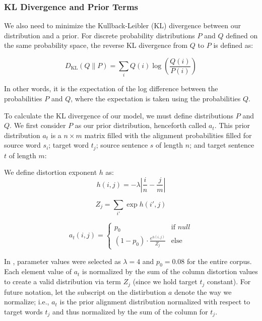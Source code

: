 \documentclass[twoside,twocolumn]{article}
\begin{document}
\subsubsection{KL Divergence and Prior Terms}

We also need to minimize the Kullback-Leibler (KL) divergence between our
distribution and a prior. For discrete probability distributions $P$ and $Q$
defined on the same probability space, the reverse KL divergence from $Q$ to
$P$ is defined as:

\begin{equation}
D_{\mathrm{KL}}(Q \| P) = \sum_{i} Q(i) \log \left( \frac{Q(i)}{P(i)} \right)
\end{equation}

In other words, it is the expectation of the log difference between the
probabilities $P$ and $Q$, where the expectation is taken using the
probabilities $Q$.

To calculate the KL divergence of our model, we must define
distributions $P$ and $Q$. We first consider $P$ as our prior
distribution, henceforth called $a_t$. This prior distribution $a_t$ is a
$n \times m$ matrix filled with the alignment probabilities filled for source
word $s_i$; target word $t_j$; source sentence $s$ of length $n$; and target
sentence $t$ of length $m$:

We define distortion exponent $h$ as:
\begin{equation}
  h(i, j) = {-\lambda \left| \frac{i}{n} - \frac{j}{m}\right|}
\end{equation}

\begin{equation}
  Z_j = \sum_{i'} \exp h(i', j)
\end{equation}

\begin{equation}
a_t (i, j) =
\begin{cases}
      p_0 & \text{if } null \\
     (1-p_0) \cdot \frac{e^{h(i,j)}}{Z_j} & \text{else}
   \end{cases}
\end{equation}

In \cite{dyer2013simple}, parameter values were selected as
$\lambda = 4$ and $p_0 = 0.08$ for the entire corpus.
Each element value of $a_t$ is normalized by the sum of the column distortion
values to create a valid distribution via term $Z_j$ (since we hold target $t_j$ constant). For future notation, let the subscript on the distirbution $a$ denote
the way we normalize; i.e., $a_t$ is the prior alignment distribution normalized
with respect to target words $t_j$ and thus normalized by the sum of the column
for $t_j$.
\end{document}
